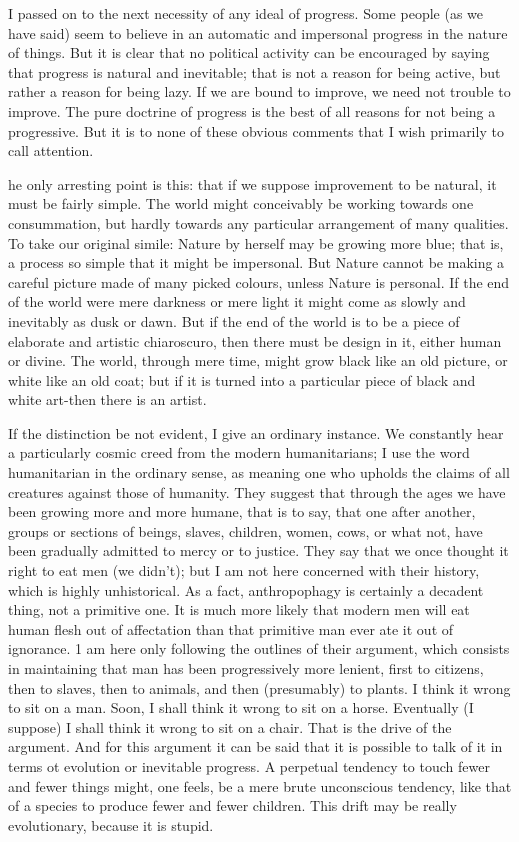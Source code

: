 \documentclass{book}
\begin{document}
I passed on to the next necessity of any ideal of progress. Some people (as we have said) seem to believe in an automatic and impersonal progress in the nature of things. But it is clear that no political activity can be encouraged by saying that progress is natural and inevitable; that is not a reason for being active, but rather a reason for being lazy. If we are bound to improve, we need not trouble to improve. The pure doctrine of progress is the best of all reasons for not being a progressive. But it is to none of these obvious comments that I wish primarily to call attention.

he only arresting point is this: that if we suppose improvement to be natural, it must be fairly simple. The world might conceivably be working towards one consummation, but hardly towards any particular arrangement of many qualities. To take our original simile: Nature by herself may be growing more blue; that is, a process so simple that it might be impersonal. But Nature cannot be making a careful picture made of many picked colours, unless Nature is personal. If the end of the world were mere darkness or mere light it might come as slowly and inevitably as dusk or dawn. But if the end of the world is to be a piece of elaborate and artistic chiaroscuro, then there must be design in it, either human or divine. The world, through mere time, might grow black like an old picture, or white like an old coat; but if it is turned into a particular piece of black and white art-then there is an artist.

If the distinction be not evident, I give an ordinary instance. We constantly hear a particularly cosmic creed from the modern humanitarians; I use the word humanitarian in the ordinary sense, as meaning one who upholds the claims of all creatures against those of humanity. They suggest that through the ages we have been growing more and more humane, that is to say, that one after another, groups or sections of beings, slaves, children, women, cows, or what not, have been gradually admitted to mercy or to justice. They say that we once thought it right to eat men (we didn’t); but I am not here concerned with their history, which is highly unhistorical. As a fact, anthropophagy is certainly a decadent thing, not a primitive one. It is much more likely that modern men will eat human flesh out of affectation than that primitive man ever ate it out of ignorance. 1 am here only following the outlines of their argument, which consists in maintaining that man has been progressively more lenient, first to citizens, then to slaves, then to animals, and then (presumably) to plants. I think it wrong to sit on a man. Soon, I shall think it wrong to sit on a horse. Eventually (I suppose) I shall think it wrong to sit on a chair. That is the drive of the argument. And for this argument it can be said that it is possible to talk of it in terms ot evolution or inevitable progress. A perpetual tendency to touch fewer and fewer things might, one feels, be a mere brute unconscious tendency, like that of a species to produce fewer and fewer children. This drift may be really evolutionary, because it is stupid.
\end{document}
